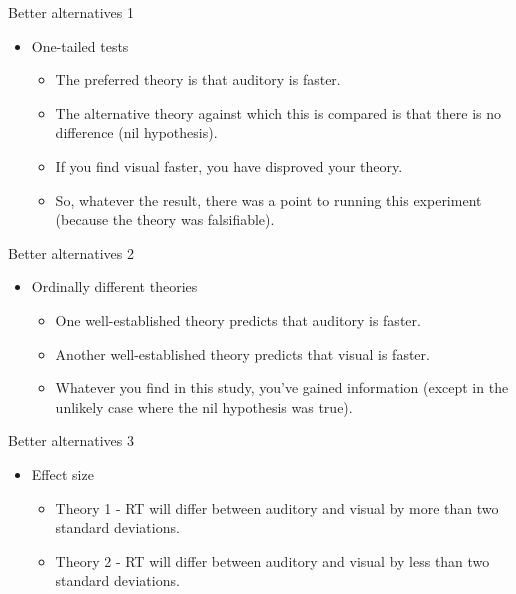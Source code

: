 \documentclass{beamer}
\begin{document}
\begin{frame}{Better alternatives 1}
\begin{itemize}
\item One-tailed tests
\begin{itemize}
\item The preferred theory is that auditory is faster.
\item The alternative theory against which this is compared is that there is no difference (nil hypothesis).
\item If you find visual faster, you have disproved your theory.
\item So, whatever the result, there was a point to running this experiment (because the theory was falsifiable).
\end{itemize}
\end{itemize}
\end{frame}


\begin{frame}{Better alternatives 2}
\begin{itemize}
\item Ordinally different theories
\begin{itemize}
\item One well-established theory predicts that auditory is faster.
\item Another well-established theory predicts that visual is faster.
\item Whatever you find in this study, you've gained information (except in the unlikely case where the nil hypothesis was true).
\end{itemize}
\end{itemize}
\end{frame}


\begin{frame}{Better alternatives 3}
\begin{itemize}
\item Effect size
\begin{itemize}
\item Theory 1 - RT will differ between auditory and visual by more than two standard deviations.
\item Theory 2 - RT will differ between auditory and visual by less than two standard deviations.
\end{itemize}
\end{itemize}
\end{frame}
\end{document}
